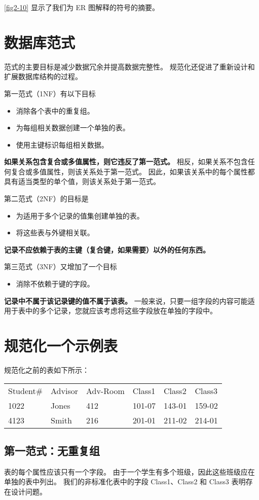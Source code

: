 \autoref{fig2-10} 显示了我们为 ER 图解释的符号的摘要。
\section{数据库范式}
范式的主要目标是减少数据冗余并提高数据完整性。 规范化还促进了重新设计和扩展数据库结构的过程。

第一范式（1NF）有以下目标
\begin{itemize}
    \item 消除各个表中的重复组。
    \item 为每组相关数据创建一个单独的表。
    \item 使用主键标识每组相关数据。
\end{itemize}
\textbf{如果关系包含复合或多值属性，则它违反了第一范式。} 相反，如果关系不包含任何复合或多值属性，则该关系处于第一范式。 因此，如果该关系中的每个属性都具有适当类型的单个值，则该关系处于第一范式。

第二范式（2NF）的目标是
\begin{itemize}
    \item 为适用于多个记录的值集创建单独的表。
    \item 将这些表与外键相关联。
\end{itemize}
\textbf{记录不应依赖于表的主键（复合键，如果需要）以外的任何东西。}

第三范式（3NF）又增加了一个目标
\begin{itemize}
    \item 消除不依赖于键的字段。
\end{itemize}
\textbf{记录中不属于该记录键的值不属于该表。} 一般来说，只要一组字段的内容可能适用于表中的多个记录，您就应该考虑将这些字段放在单独的字段中。
\section{规范化一个示例表}
规范化之前的表如下所示：
\begin{table}[h]
    \centering
    \begin{tabular}{llllll}
        Student\# & Advisor & Adv-Room & Class1 & Class2 & Class3 \\
        1022      & Jones   & 412      & 101-07 & 143-01 & 159-02 \\
        4123      & Smith   & 216      & 201-01 & 211-02 & 214-01 \\
    \end{tabular}
\end{table}
\subsection{第一范式：无重复组}
表的每个属性应该只有一个字段。 由于一个学生有多个班级，因此这些班级应在单独的表中列出。 我们的非标准化表中的字段 Class1、Class2 和 Class3 表明存在设计问题。

